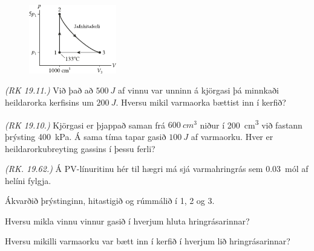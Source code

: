\begin{enumerate}[label = \textbf{Dæmi \thechapter.\arabic*.}]

\setcounter{enumi}{13}


\begin{minipage}{\linewidth}

\begin{figure}
\hspace{0.5cm}
\includegraphics[width = 1.5in]{figures/pV-dia.pdf}

\end{figure}

\item \textit{(RK 19.11.)} Við það að $\SI{500}{J}$ af vinnu var unninn á kjörgasi þá minnkaði heildarorka kerfisins um $\SI{200}{J}$. Hversu mikil varmaorka bættist inn í kerfið?

\item \textit{(RK 19.10.)} Kjörgasi er þjappað saman frá $\SI{600}{cm^3}$ niður í \SI{200}{cm^3} við fastann þrýsting \SI{400}{kPa}. Á sama tíma tapar gasið $\SI{100}{J}$ af varmaorku. Hver er heildarorkubreyting gassins í þessu ferli?

\item \textit{(RK. 19.62.)} Á PV-línuritinu hér til hægri má sjá varmahringrás sem \SI{0.03}{mól} af helíni fylgja. \begin{enumerate*}[label =\textbf{(\alph*)}]
    \item Ákvarðið þrýstinginn, hitastigið og rúmmálið í 1, 2 og 3.
    \item Hversu mikla vinnu vinnur gasið í hverjum hluta hringrásarinnar?
    \item Hversu mikilli varmaorku var bætt inn í kerfið í hverjum lið hringrásarinnar?
\end{enumerate*}


\end{minipage}
\end{enumerate}
